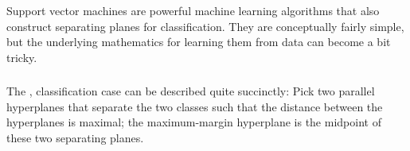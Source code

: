 \documentclass[xetex,mathserif,serif,aspectratio=169]{beamer}
\begin{document}
{
\begin{frame}[plain]
\end{frame}
}

\begin{frame}[fragile] \frametitle{} \oldB \small

\textbf{}

Support vector machines are powerful machine learning algorithms that also construct
separating planes for classification. They are conceptually fairly simple, but the
underlying mathematics for learning them from data can become a bit tricky.

\end{frame}

\begin{frame}[fragile] \frametitle{} \oldB \small

\textbf{}

The ,  classification case can be described
quite succinctly: Pick two parallel hyperplanes that separate the two classes such
that the distance between the hyperplanes is maximal; the maximum-margin hyperplane
is the midpoint of these two separating planes.

\end{frame}
\end{document}
